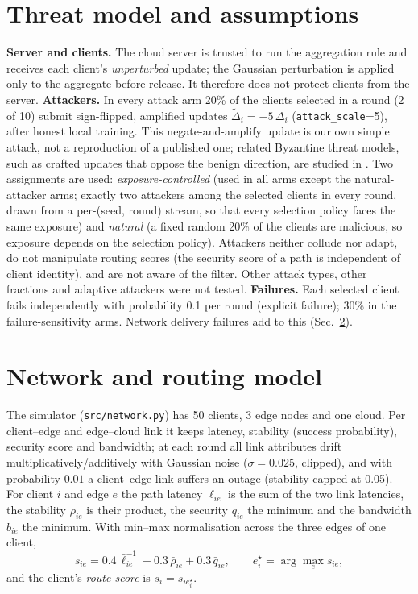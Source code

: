 \documentclass[preprint,12pt,times,numafflabel]{elsarticle}
\begin{document}


\section{Threat model and assumptions}
\label{sec:threat}
\textbf{Server and clients.} The cloud server is trusted to run the aggregation rule and receives each client's \emph{unperturbed} update; the Gaussian perturbation is applied only to the aggregate before release. It therefore does not protect clients from the server. \textbf{Attackers.} In every attack arm 20\% of the clients selected in a round (2 of 10) submit sign-flipped, amplified updates $\tilde\Delta_i=-5\,\Delta_i$ (\texttt{attack\_scale}=5), after honest local training. This negate-and-amplify update is our own simple attack, not a reproduction of a published one; related Byzantine threat models, such as crafted updates that oppose the benign direction, are studied in \cite{fang2020local,yin2018byzantine}. Two assignments are used: \emph{exposure-controlled} (used in all arms except the natural-attacker arms; exactly two attackers among the selected clients in every round, drawn from a per-(seed, round) stream, so that every selection policy faces the same exposure) and \emph{natural} (a fixed random 20\% of the clients are malicious, so exposure depends on the selection policy). Attackers neither collude nor adapt, do not manipulate routing scores (the security score of a path is independent of client identity), and are not aware of the filter. Other attack types, other fractions and adaptive attackers were not tested. \textbf{Failures.} Each selected client fails independently with probability 0.1 per round (explicit failure); 30\% in the failure-sensitivity arms. Network delivery failures add to this (Sec.~\ref{sec:network}).

\section{Network and routing model}
\label{sec:network}
The simulator (\texttt{src/network.py}) has 50 clients, 3 edge nodes and one cloud. Per client--edge and edge--cloud link it keeps latency, stability (success probability), security score and bandwidth; at each round all link attributes drift multiplicatively/additively with Gaussian noise ($\sigma=0.025$, clipped), and with probability $0.01$ a client--edge link suffers an outage (stability capped at 0.05). For client $i$ and edge $e$ the path latency $\ell_{ie}$ is the sum of the two link latencies, the stability $\rho_{ie}$ is their product, the security $q_{ie}$ the minimum and the bandwidth $b_{ie}$ the minimum. With min--max normalisation across the three edges of one client,
\begin{equation}
s_{ie}=0.4\,\bar\ell^{-1}_{ie}+0.3\,\bar\rho_{ie}+0.3\,\bar q_{ie},\qquad e_i^\star=\arg\max_e s_{ie},
\end{equation}
and the client's \emph{route score} is $s_i=s_{ie_i^\star}$.
\end{document}
